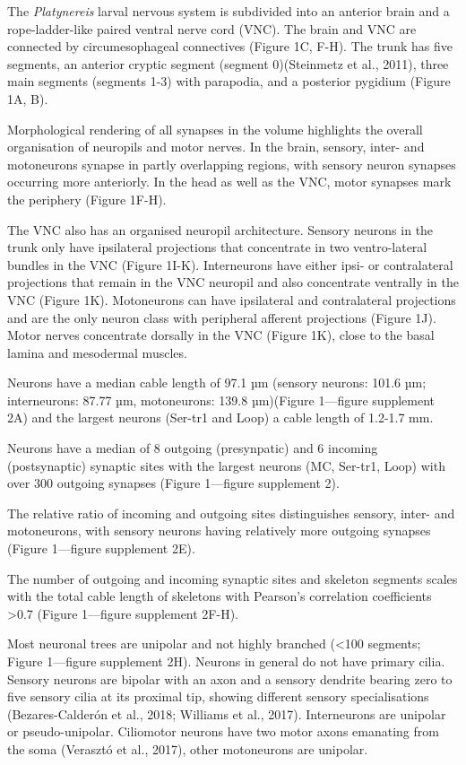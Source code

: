 \documentclass[
  11pt,
]{article}
\begin{document}
The \emph{Platynereis} larval nervous system is subdivided into an
anterior brain and a rope-ladder-like paired ventral nerve cord (VNC).
The brain and VNC are connected by circumesophageal connectives (Figure
1C, F-H). The trunk has five segments, an anterior cryptic segment
(segment 0)(Steinmetz et al., 2011), three main segments (segments 1-3)
with parapodia, and a posterior pygidium (Figure 1A, B).

Morphological rendering of all synapses in the volume highlights the
overall organisation of neuropils and motor nerves. In the brain,
sensory, inter- and motoneurons synapse in partly overlapping regions,
with sensory neuron synapses occurring more anteriorly. In the head as
well as the VNC, motor synapses mark the periphery (Figure 1F-H).

The VNC also has an organised neuropil architecture. Sensory neurons in
the trunk only have ipsilateral projections that concentrate in two
ventro-lateral bundles in the VNC (Figure 1I-K). Interneurons have
either ipsi- or contralateral projections that remain in the VNC
neuropil and also concentrate ventrally in the VNC (Figure 1K).
Motoneurons can have ipsilateral and contralateral projections and are
the only neuron class with peripheral afferent projections (Figure 1J).
Motor nerves concentrate dorsally in the VNC (Figure 1K), close to the
basal lamina and mesodermal muscles.

Neurons have a median cable length of 97.1 µm (sensory neurons: 101.6
µm; interneurons: 87.77 µm, motoneurons: 139.8 µm)(Figure 1---figure
supplement 2A) and the largest neurons (Ser-tr1 and Loop) a cable length
of 1.2-1.7 mm.

Neurons have a median of 8 outgoing (presynpatic) and 6 incoming
(postsynaptic) synaptic sites with the largest neurons (MC, Ser-tr1,
Loop) with over 300 outgoing synapses (Figure 1---figure supplement 2).

The relative ratio of incoming and outgoing sites distinguishes sensory,
inter- and motoneurons, with sensory neurons having relatively more
outgoing synapses (Figure 1---figure supplement 2E).

The number of outgoing and incoming synaptic sites and skeleton segments
scales with the total cable length of skeletons with Pearson's
correlation coefficients \textgreater0.7 (Figure 1---figure supplement
2F-H).

Most neuronal trees are unipolar and not highly branched (\textless100
segments; Figure 1---figure supplement 2H). Neurons in general do not
have primary cilia. Sensory neurons are bipolar with an axon and a
sensory dendrite bearing zero to five sensory cilia at its proximal tip,
showing different sensory specialisations (Bezares-Calderón et al.,
2018; Williams et al., 2017). Interneurons are unipolar or
pseudo-unipolar. Ciliomotor neurons have two motor axons emanating from
the soma (Verasztó et al., 2017), other motoneurons are unipolar.
\end{document}
